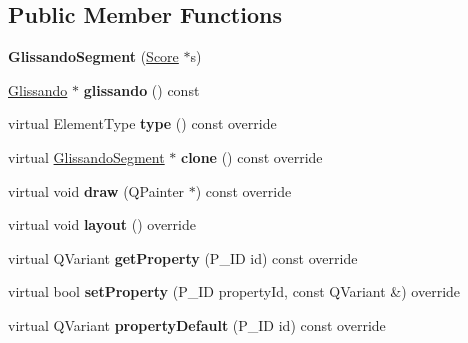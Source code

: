 \subsection*{Public Member Functions}
\begin{DoxyCompactItemize}
\item 
\mbox{\label{class_ms_1_1_glissando_segment_ac2f9ba339da606f61370cc5f44bdacc2}} 
{\bfseries Glissando\+Segment} (\hyperlink{class_ms_1_1_score}{Score} $\ast$s)
\item 
\mbox{\label{class_ms_1_1_glissando_segment_a93c3387b7ec6b4466c3d26417d3e0e2b}} 
\hyperlink{class_ms_1_1_glissando}{Glissando} $\ast$ {\bfseries glissando} () const
\item 
\mbox{\label{class_ms_1_1_glissando_segment_a0a217d32fcbdb82abdd5cf9d252d1cbe}} 
virtual Element\+Type {\bfseries type} () const override
\item 
\mbox{\label{class_ms_1_1_glissando_segment_a85332236e25f4c88dfb85944cec7d4dd}} 
virtual \hyperlink{class_ms_1_1_glissando_segment}{Glissando\+Segment} $\ast$ {\bfseries clone} () const override
\item 
\mbox{\label{class_ms_1_1_glissando_segment_a769ee3c6753bb9ef3dc726df210ca415}} 
virtual void {\bfseries draw} (Q\+Painter $\ast$) const override
\item 
\mbox{\label{class_ms_1_1_glissando_segment_a2d874c8a3a728d4e40a33dc96f35ec2c}} 
virtual void {\bfseries layout} () override
\item 
\mbox{\label{class_ms_1_1_glissando_segment_a66cef04920668407cf26f19b76fe5ac2}} 
virtual Q\+Variant {\bfseries get\+Property} (P\+\_\+\+ID id) const override
\item 
\mbox{\label{class_ms_1_1_glissando_segment_a99cd467143c9849b886b76b85df007ba}} 
virtual bool {\bfseries set\+Property} (P\+\_\+\+ID property\+Id, const Q\+Variant \&) override
\item 
\mbox{\label{class_ms_1_1_glissando_segment_ab9c1cf30daf63df58f2033f2f4174d4f}} 
virtual Q\+Variant {\bfseries property\+Default} (P\+\_\+\+ID id) const override
\end{DoxyCompactItemize}
